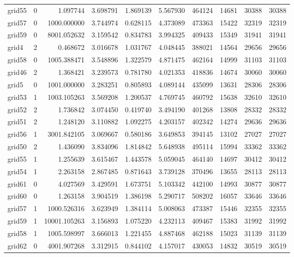 \documentclass[../../../thesis.tex]{subfiles}
\begin{document}
\begin{longtable}{|l|r|r|r|r|r|r|r|r|r|}
grid55 & 0 & 1.097744 & 3.698791 & 1.869139 & 5.567930 & 464124 & 14681 & 30388 & 30388 \\
grid57 & 0 & 1000.000000 & 3.744974 & 0.628115 & 4.373089 & 473363 & 15422 & 32319 & 32319 \\
grid59 & 0 & 8001.052632 & 3.159542 & 0.834783 & 3.994325 & 409433 & 15349 & 31941 & 31941 \\
grid4 & 2 & 0.468672 & 3.016678 & 1.031767 & 4.048445 & 388021 & 14564 & 29656 & 29656 \\
grid58 & 0 & 1005.388471 & 3.548896 & 1.322579 & 4.871475 & 462164 & 14999 & 31103 & 31103 \\
grid46 & 2 & 1.368421 & 3.239573 & 0.781780 & 4.021353 & 418836 & 14674 & 30060 & 30060 \\
grid5 & 0 & 1001.000000 & 3.283251 & 0.805893 & 4.089144 & 435099 & 13631 & 28306 & 28306 \\
grid53 & 1 & 1003.105263 & 3.569208 & 1.200537 & 4.769745 & 460792 & 15638 & 32610 & 32610 \\
grid52 & 2 & 1.736842 & 3.074450 & 0.419740 & 3.494190 & 401268 & 13808 & 28332 & 28332 \\
grid51 & 2 & 1.248120 & 3.110882 & 1.092275 & 4.203157 & 402342 & 14274 & 29636 & 29636 \\
grid56 & 1 & 3001.842105 & 3.069667 & 0.580186 & 3.649853 & 394145 & 13102 & 27027 & 27027 \\
grid50 & 2 & 1.436090 & 3.834096 & 1.814842 & 5.648938 & 495114 & 15994 & 33362 & 33362 \\
grid55 & 1 & 1.255639 & 3.615467 & 1.443578 & 5.059045 & 464140 & 14697 & 30412 & 30412 \\
grid54 & 1 & 2.263158 & 2.867485 & 0.871643 & 3.739128 & 370496 & 13655 & 28113 & 28113 \\
grid61 & 0 & 4.027569 & 3.429591 & 1.673751 & 5.103342 & 442100 & 14993 & 30877 & 30877 \\
grid60 & 0 & 1.263158 & 3.904519 & 1.386198 & 5.290717 & 508202 & 16057 & 33646 & 33646 \\
grid57 & 1 & 1000.526316 & 3.623949 & 1.384114 & 5.008063 & 473387 & 15446 & 32355 & 32355 \\
grid59 & 1 & 10001.105263 & 3.156893 & 1.075220 & 4.232113 & 409467 & 15383 & 31992 & 31992 \\
grid58 & 1 & 1005.598997 & 3.666013 & 1.221455 & 4.887468 & 462188 & 15023 & 31139 & 31139 \\
grid62 & 0 & 4001.907268 & 3.312915 & 0.844102 & 4.157017 & 430053 & 14832 & 30519 & 30519 \\

\end{longtable}
\end{document}
